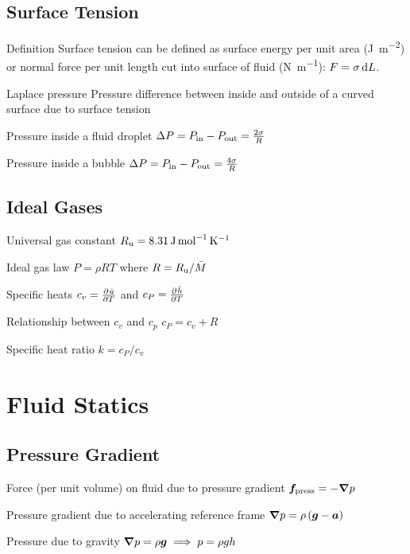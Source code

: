 \documentclass{article}
\begin{document}
\subsection{Surface Tension}
\begin{description*}
\item[Definition] Surface tension can be defined as surface energy per unit area
  (\si{\joule\per\square\meter}) or normal force per unit length cut into surface of fluid
  (\si{\newton\per\meter}): \(F = \sigma \dif L\).
\item[Laplace pressure] Pressure difference between inside and outside of a curved surface due to
  surface tension
  \begin{description*}
  \item[Pressure inside a fluid droplet]
    \(\Delta P = P_{\mathrm{in}} -
    P_{\mathrm{out}} = \frac{2\sigma}{R}\)
  \item[Pressure inside a bubble] \(\Delta P = P_{\mathrm{in}} -
    P_{\mathrm{out}} = \frac{4\sigma}{R}\)
  \end{description*}
\end{description*}

\subsection{Ideal Gases}
\begin{description*}
\item[Universal gas constant]
  \(R_{\mathrm{u}} = \SI{8.31}{\joule\per\mole\per\kelvin}\)
\item[Ideal gas law]
  \(P = \rho R T\) where \(R = R_{\mathrm{u}}/\bar{M}\)
\item[Specific heats]
  \(c_v = \pd{\hat u}{T}\) and \(c_P = \pd{\hat h}{T}\)
\item[Relationship between $c_v$ and $c_p$]
  \(c_P = c_v + R\)
\item[Specific heat ratio]
  \(k = c_P/c_v\)
\end{description*}

\section{Fluid Statics}

\subsection{Pressure Gradient}
\begin{description*}
\item[Force (per unit volume) on fluid due to pressure gradient]
  \(\bm{f}_{\mathrm{press}} = -\bm{\nabla} p\)
\item[Pressure gradient due to accelerating reference frame]
  \(\bm{\nabla} p = \rho \left(\bm{g}-\bm{a}\right)\)
\item[Pressure due to gravity]
  \(\bm{\nabla} p = \rho \bm{g} \implies p = \rho g h\)
\end{description*}
\end{document}

